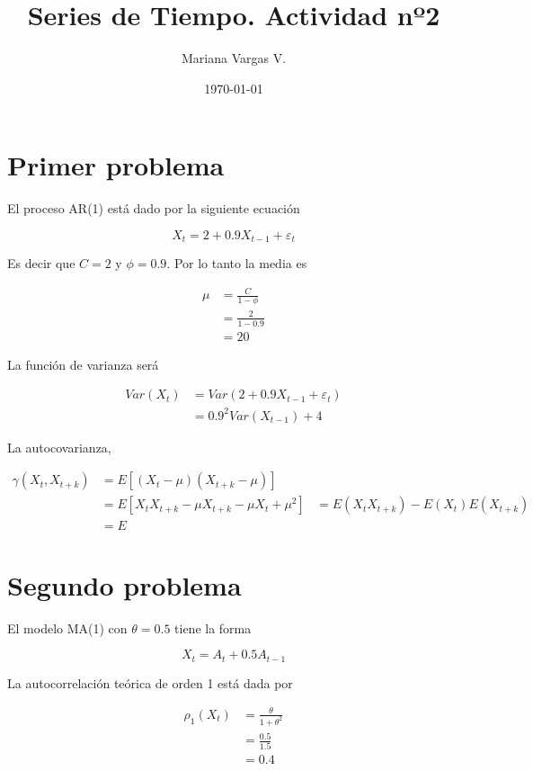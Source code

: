 \documentclass[a4paper,10pt]{article}
\title{Series de Tiempo. Actividad nº2}
\author{Mariana Vargas V.}
\date{\today}
\begin{document}
\maketitle

\section{Primer problema}

El proceso AR(1) está dado por la siguiente ecuación

\begin{equation}
 X_t = 2 + 0.9 X_{t-1} + \varepsilon_t
\end{equation}

Es decir que $C = 2$ y $\phi = 0.9$. Por lo tanto la media es

\begin{align*}
 \mu &= \frac{C}{1 - \phi}\\
 &= \frac{2}{1 - 0.9}\\
 &= 20
\end{align*}

La función de varianza será

\begin{align*}
 Var(X_t) &= Var(2 + 0.9X_{t-1} + \varepsilon_t)\\
 &= 0.9^2 Var(X_{t-1}) + 4
\end{align*}

La autocovarianza,

\begin{align*}
 \gamma(X_t, X_{t+k}) &= E[(X_t - \mu)(X_{t+k} - \mu)]\\
 &= E[X_tX_{t+k} - \mu X_{t+k} - \mu X_t + \mu^2]
 &= E(X_tX_{t+k}) - E(X_t)E(X_{t+k})\\
 &= E
\end{align*}

\section{Segundo problema}

El modelo MA(1) con $\theta = 0.5$ tiene la forma

\begin{equation*}
 X_t = A_t + 0.5 A_{t-1}
\end{equation*}

La autocorrelación teórica de orden 1 está dada por

\begin{align}
 \rho_1(X_t) &= \frac{\theta}{1 + \theta^2}\\
 &= \frac{0.5}{1.5} \\
 &= 0.4
\end{align}
\end{document}
